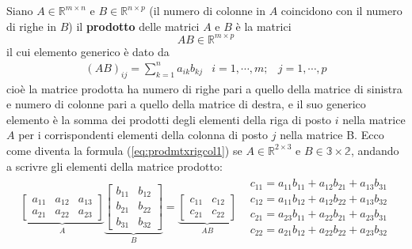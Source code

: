 Siano $A\in \mathds{R}^{m\times n}$ e $B\in \mathds{R}^{n\times p}$ (il numero di
colonne in $A$ coincidono con il numero di righe in $B$) il \textbf{prodotto} delle
matrici $A$ e $B$ è la matrici
\begin{equation*}
  AB\in \mathds{R}^{m\times p}
\end{equation*}
il cui elemento generico è dato da
\begin{eqnarray}
  \label{eq:prodmtxrigcol1}
  (AB)_{ij}=\sum_{k=1}^na_{ik}b_{kj} & i=1,\cdots,m; & j = 1,\cdots,p
\end{eqnarray}
cioè la matrice prodotta ha numero di righe pari a quello della matrice di sinistra
e numero di colonne pari a quello della matrice di destra, e il suo generico elemento
è la somma dei prodotti degli elementi della riga di posto $i$ nella matrice $A$ per
i corrispondenti elementi della colonna di posto $j$ nella matrice B.
Ecco come diventa la formula (\ref{eq:prodmtxrigcol1}) se $A\in \mathds{R}^{2\times3}$
e $B\in \mathds{3\times 2}$, andando a scrivre gli elementi della matrice prodotto:
\begin{eqnarray}
  \label{eq:prodmtxrigcol2}
  \underbrace{\begin{bmatrix}
    a_{11} & a_{12} & a_{13}\\
    a_{21} & a_{22} & a_{23}
  \end{bmatrix}}_{A}
  \underbrace{\begin{bmatrix}
    b_{11} & b_{12} \\
    b_{21} & b_{22} \\
    b_{31} & b_{32}
  \end{bmatrix}}_{B}=
  \underbrace{\begin{bmatrix}
    c_{11} & c_{12}\\
    c_{21} & c_{22} 
  \end{bmatrix}}_{AB} &
                  \begin{matrix}
                    c_{11}=a_{11}b_{11} + a_{12}b_{21} + a_{13} b_{31}\\
                    c_{12}=a_{11}b_{12} + a_{12}b_{22} + a_{13} b_{32}\\
                    c_{21}=a_{23}b_{11} + a_{22}b_{21} + a_{23} b_{31}\\
                    c_{22}=a_{21}b_{12} + a_{22}b_{22} + a_{23} b_{32}
                  \end{matrix}
\end{eqnarray}
